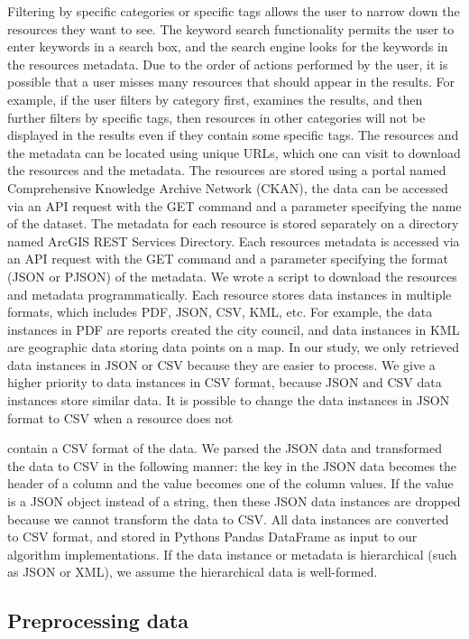 Filtering by specific categories or specific tags allows the user to narrow down the resources they want to see. The keyword search functionality permits the user to enter keywords in a search box, and the search engine looks for the keywords in the resources metadata. Due to the order of actions performed by the user, it is possible that a user misses many resources that should appear in the results. For example, if the user filters by category first, examines the results, and then further filters by specific tags, then resources in other categories will not be displayed in the results even if they contain some specific tags.
The resources and the metadata can be located using unique URLs, which one can visit to download the resources and the metadata. The resources are stored using a portal named Comprehensive Knowledge Archive Network (CKAN), the data can be accessed via an API request with the GET command and a parameter specifying the name of the dataset. The metadata for each resource is stored separately on a directory named ArcGIS REST Services Directory. Each resources metadata is accessed via an API request with the GET command and a parameter specifying the format (JSON or PJSON) of the metadata. We wrote a script to download the resources and metadata programmatically.
Each resource stores data instances in multiple formats, which includes PDF, JSON, CSV, KML, etc. For example, the data instances in PDF are reports created the city council, and data instances in KML are geographic data storing data points on a map. In our study, we only retrieved data instances in JSON or CSV because they are easier to process. We give a higher priority to data instances in CSV format, because JSON and CSV data instances store similar data. It is possible to change the data instances in JSON format to CSV when a resource does not

contain a CSV format of the data. We parsed the JSON data and transformed the data to CSV in the following manner: the key in the JSON data becomes the header of a column and the value becomes one of the column values. If the value is a JSON object instead of a string, then these JSON data instances are dropped because we cannot transform the data to CSV. All data instances are converted to CSV format, and stored in Pythons Pandas DataFrame as input to our algorithm implementations.
If the data instance or metadata is hierarchical (such as JSON or XML), we assume the hierarchical data is well-formed.

\subsection{Preprocessing data}

